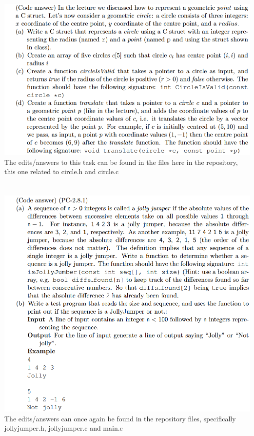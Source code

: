 \documentclass{article}
\begin{document}
\section{}
\includegraphics[width=\linewidth, keepaspectratio=true]{task6}
\vspace{2pt}\\
The edits/answers to this task can be found in the files here in the repository, this one related to circle.h and circle.c


\section{}
\includegraphics[width=\linewidth, keepaspectratio=true]{task7}
\vspace{2pt}\\
The edits/answers can once again be found in the repository files, specifically jollyjumper.h, jollyjumper.c and main.c
\end{document}
